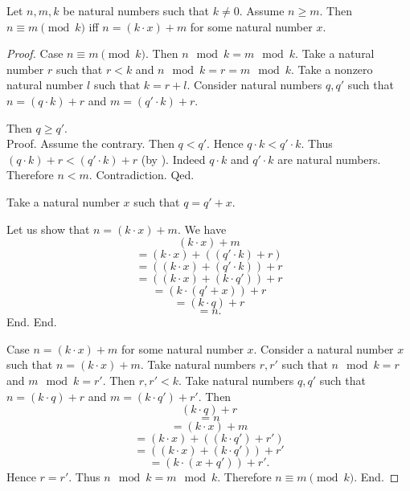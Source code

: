 \documentclass[10pt]{article}
\begin{document}
  \begin{forthel}
    \begin{proposition}[id=ARITHMETIC_08_2034122983735296,printid]
      Let $n, m, k$ be natural numbers such that $k \neq 0$.
      Assume $n \geq m$.
      Then $n \equiv m \pmod{k}$ iff $n = (k \cdot x) + m$ for some natural number $x$.
    \end{proposition}
    \begin{proof}
      Case $n \equiv m \pmod{k}$.
        Then $n \mod k = m \mod k$.
        Take a natural number $r$ such that $r < k$ and $n \mod k = r = m \mod k$.
        Take a nonzero natural number $l$ such that $k = r + l$.
        Consider natural numbers $q,q'$ such that $n = (q \cdot k) + r$ and $m = (q' \cdot k) + r$.

        Then $q \geq q'$. \\
        Proof.
          Assume the contrary.
          Then $q < q'$.
          Hence $q \cdot k < q' \cdot k$.
          Thus $(q \cdot k) + r < (q' \cdot k) + r$ (by ).
          Indeed $q \cdot k$ and $q' \cdot k$ are natural numbers.
          Therefore $n < m$.
          Contradiction.
        Qed.

        Take a natural number $x$ such that $q = q' + x$.

        Let us show that $n = (k \cdot x) + m$.
          We have
          \[  (k \cdot x) + m                       \]
          \[    = (k \cdot x) + ((q' \cdot k) + r)  \]
          \[    = ((k \cdot x) + (q' \cdot k)) + r  \]
          \[    = ((k \cdot x) + (k \cdot q')) + r  \]
          \[    = (k \cdot (q' + x)) + r            \]
          \[    = (k \cdot q) + r                   \]
          \[    = n.                                \]
        End.
      End.

      Case $n = (k \cdot x) + m$ for some natural number $x$.
        Consider a natural number $x$ such that $n = (k \cdot x) + m$.
        Take natural numbers $r, r'$ such that $n \mod k = r$ and $m \mod k = r'$.
        Then $r, r' < k$.
        Take natural numbers $q, q'$ such that $n = (k \cdot q) + r$ and $m = (k \cdot q') + r'$.
        Then
        \[  (k \cdot q) + r                         \]
        \[    = n                                   \]
        \[    = (k \cdot x) + m                     \]
        \[    = (k \cdot x) + ((k \cdot q') + r')   \]
        \[    = ((k \cdot x) + (k \cdot q')) + r'   \]
        \[    = (k \cdot (x + q')) + r'.            \]
        Hence $r = r'$.
        Thus $n \mod k = m \mod k$.
        Therefore $n \equiv m \pmod{k}$.
      End.
    \end{proof}
  \end{forthel}
\end{document}

